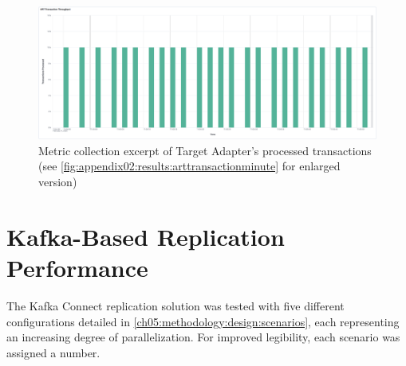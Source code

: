 \begin{figure}[htbp]
    \centering
    \includegraphics[width=1\textwidth]{chapters/images/art-performance/art-transaction-throughput-minute.png}
    \caption[Metric collection excerpt of Target Adapter's processed transactions]{Metric collection excerpt of Target Adapter's processed transactions (see \ref{fig:appendix02:results:arttransactionminute} for enlarged version)}
    \label{fig:chapter06:results:arttransactionminute}
\end{figure}

\section{Kafka-Based Replication Performance}
\label{ch06:results:artperformance}
The Kafka Connect replication solution was tested with five different configurations detailed in \ref{ch05:methodology:design:scenarios}, each representing an increasing degree of parallelization. For improved legibility, each scenario was assigned a number.

